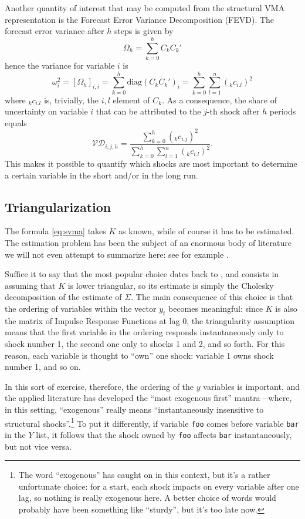 Another quantity of interest that may be computed from the structural
VMA representation is the Forecast Error Variance Decomposition
(FEVD). The forecast error variance after $h$ steps is given by
\[
  \Omega_h = \sum_{k=0}^h C_k C_k'
\]
hence the variance for variable $i$ is
\[
  \omega^2_i = \left[ \Omega_h \right]_{i,i} = \sum_{k=0}^h
  \mathrm{diag}(C_k C_k')_i =
  \sum_{k=0}^h \sum_{l=1}^n ({}_kc_{i.l})^2 
\]
where ${}_kc_{i.l}$ is, trivially, the $i,l$ element of $C_k$. As a
consequence, the share of uncertainty on variable $i$ that can be
attributed to the $j$-th shock after $h$ periods equals
\[
  \mathcal{VD}_{i,j,h} =
  \frac{\sum_{k=0}^h ({}_kc_{i.j})^2 }{  \sum_{k=0}^h \sum_{l=1}^n
    ({}_kc_{i.l})^2 } .
\]
This makes it possible to quantify which shocks are most important to
determine a certain variable in the short and/or in the long run.

\subsection{Triangularization}

The formula \ref{eq:svma} takes $K$ as known, while of course it has
to be estimated. The estimation problem has been the subject of an
enormous body of literature we will not even attempt to summarize
here: see for example \cite[chapter 9]{LKBook05}.

Suffice it to say that the most popular choice dates back to
\cite{sims80}, and consists in assuming that $K$ is lower triangular,
so its estimate is simply the Cholesky decomposition of the estimate
of $\Sigma$. The main consequence of this choice is that the ordering
of variables within the vector $y_t$ becomes meaningful: since $K$ is
also the matrix of Impulse Response Functions at lag 0, the
triangularity assumption means that the first variable in the ordering
responds instantaneously only to shock number 1, the second one only
to shocks 1 and 2, and so forth. For this reason, each variable is
thought to ``own'' one shock: variable 1 owns shock number 1,
and so on.

In this sort of exercise, therefore, the ordering of the $y$ variables
is important, and the applied literature has developed the ``most
exogenous first'' mantra---where, in this setting, ``exogenous'' really
means ``instantaneously insensitive to structural
shocks''.\footnote{The word ``exogenous'' has caught on in this
  context, but it's a rather unfortunate choice: for a start, each
  shock impacts on every variable after one lag, so nothing is really
  exogenous here. A better choice of words would probably have
  been something like ``sturdy'', but it's too late now.} To put it
differently, if variable \texttt{foo} comes before variable
\texttt{bar} in the $Y$ list, it follows that the shock owned by
\texttt{foo} affects \texttt{bar} instantaneously, but not
vice versa.

